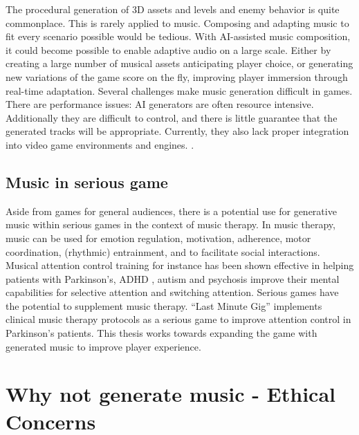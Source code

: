 The procedural generation of 3D assets and levels and enemy behavior is quite commonplace. This is rarely applied to music. Composing and adapting music to fit every scenario possible would be tedious. With AI-assisted music composition, it could become possible to enable adaptive audio on a large scale. Either by creating a large number of musical assets anticipating player choice, or generating new variations of the game score on the fly, improving player immersion through real-time adaptation. Several challenges make music generation difficult in games. There are performance issues: AI generators are often resource intensive. Additionally they are difficult to control, and there is little guarantee that the generated tracks will be appropriate. \cite{Plut_Pasquier_2020} Currently, they also lack proper integration into video game environments and engines. \cite{Worrall_Collins_2024}.

\subsection{Music in serious game}							
Aside from games for general audiences, there is a potential use for generative music within serious games in the context of music therapy. In music therapy, music can be used for emotion regulation, motivation, adherence, motor coordination, (rhythmic) entrainment, and to facilitate social interactions. \cite{musicwellbeing_agres_2021} Musical attention control training for instance has been shown effective in helping patients with Parkinson’s\cite{Park_Kim_2021}, ADHD \cite{Martin-Moratinos_Bella-Fernández_Blasco-Fontecilla_2023}, autism \cite{Pasiali_LaGasse_Penn_2014} and psychosis \cite{van_Alphen_Stams_Hakvoort_2019} improve their mental capabilities for selective attention and switching attention. Serious games have the potential to supplement music therapy. “Last Minute Gig” \cite{Chalkiadakis_2022} implements clinical music therapy protocols as a serious game to improve attention control in Parkinson's patients. This thesis works towards expanding the game with generated music to improve player experience.


\section{Why not generate music - Ethical Concerns}
